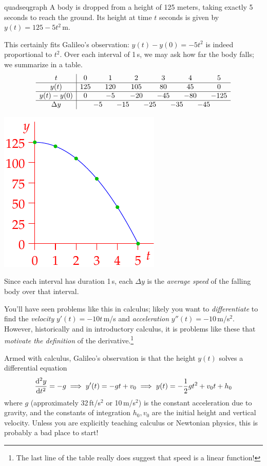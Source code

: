 \begin{example}{}{quadseqgraph}
	A body is dropped from a height of 125 meters, taking exactly 5 seconds to reach the ground. Its height at time $t$ seconds is given by $y(t)=125-5t^2$\,m.\smallbreak
	\begin{minipage}[t]{0.68\linewidth}\vspace{-8pt}
	This certainly fits Galileo's observation: $y(t)-y(0)=-5t^2$ is indeed proportional to $t^2$.\smallbreak
	Over each interval of 1\,s, we may ask how far the body falls; we summarize in a table.
	\[
		\begin{array}{c|ccccccccccc}
			t&0&&1&&2&&3&&4&&5\\\hline
			y(t)&125&&120&&105&&80&&45&&0\\\hline
			y(t)-y(0)&0&&-5&&-20&&-45&&-80&&-125\\\hline
			\Delta y&&\makebox[0pt][c]{$-5$}&&\makebox[0pt][c]{$-15$}&&\makebox[0pt][c]{$-25$}&&\makebox[0pt][c]{$-35$}&&\makebox[0pt][c]{$-45$}
		\end{array}
	\]
	\end{minipage}
	\hfill
	\begin{minipage}[t]{0.29\linewidth}\vspace{-25pt}
		\flushright
		\includegraphics{poly-quad5}
	\end{minipage}\medbreak
	Since each interval has duration 1\,s, each $\Delta y$ is the \emph{average speed} of the falling body over that interval.
\end{example}

You'll have seen problems like this in calculus; likely you want to \emph{differentiate} to find the \emph{velocity} $y'(t)=-10t$\,m/s and \emph{acceleration} $y''(t)=-10$\,m/s$^2$. However, historically and in introductory calculus, it is problems like these that \emph{motivate the definition} of the derivative.\footnote{The last line of the table really does suggest that speed is a linear function!}\par
Armed with calculus, Galileo's observation is that the height $y(t)$ solves a differential equation
\[
	\diff[^2y]{t^2}=-g \implies y'(t)=-gt+v_0\implies y(t)=-\frac 12gt^2+v_0t+h_0
\]
where $g$ (approximately 32\,ft/s$^2$ or 10\,m/s$^2$) is the constant acceleration due to gravity, and the constants of integration $h_0,v_0$ are the initial height and vertical velocity. Unless you are explicitly teaching calculus or Newtonian physics, this is probably a bad place to start! 



